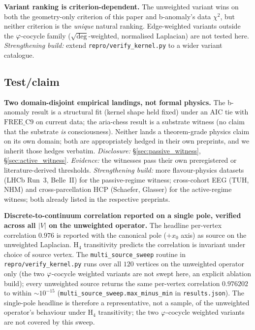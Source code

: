 \textbf{Variant ranking is criterion-dependent.} The unweighted
variant wins on both the geometry-only criterion of this paper
and b-anomaly's data $\chi^{2}$, but neither criterion is the
\emph{unique} natural ranking. Edge-weighted variants outside the
$\varphi$-cocycle family ($\sqrt{\deg}$-weighted, normalised
Laplacian) are not tested here. \emph{Strengthening build:}
extend \texttt{repro/verify\_kernel.py} to a wider variant
catalogue.

\subsection{Test/claim}\label{ssec:testclaim}

\textbf{Two domain-disjoint empirical landings, not formal physics.}
The b-anomaly result is a structural fit (kernel shape held fixed)
under an AIC tie with $\mathrm{FREE\_C9}$ on current data; the
aria-chess result is a substrate witness (no claim that the
substrate \emph{is} consciousness). Neither lands a theorem-grade
physics claim on its own domain; both are appropriately
hedged in their own preprints, and we inherit those hedges
verbatim. \emph{Disclosure:} \S\ref{sec:passive_witness},
\S\ref{sec:active_witness}. \emph{Evidence:} the witnesses pass
their own preregistered or literature-derived thresholds.
\emph{Strengthening build:} more flavour-physics datasets
(LHCb Run~3, Belle~II) for the passive-regime witness;
cross-cohort EEG (TUH, NHM) and cross-parcellation HCP
(Schaefer, Glasser) for the active-regime witness; both already
listed in the respective preprints.

\textbf{Discrete-to-continuum correlation reported on a single pole,
verified across all $|V|$ on the unweighted operator.} The
headline per-vertex correlation $0.976$ is reported with the
canonical pole ($+x_{0}$ axis) as source on the unweighted
Laplacian. H$_4$ transitivity predicts the correlation is
invariant under choice of source vertex. The
\texttt{multi\_source\_sweep} routine in
\texttt{repro/verify\_kernel.py} runs over all $120$ vertices on
the unweighted operator only (the two $\varphi$-cocycle weighted
variants are not swept here, an explicit ablation build); every
unweighted source returns the same per-vertex correlation
$0.976202$ to within $\sim 10^{-15}$
(\texttt{multi\_source\_sweep.max\_minus\_min} in
\texttt{results.json}). The single-pole headline is therefore a
representative, not a sample, of the unweighted operator's
behaviour under H$_4$ transitivity; the two $\varphi$-cocycle weighted
variants are not covered by this sweep.

